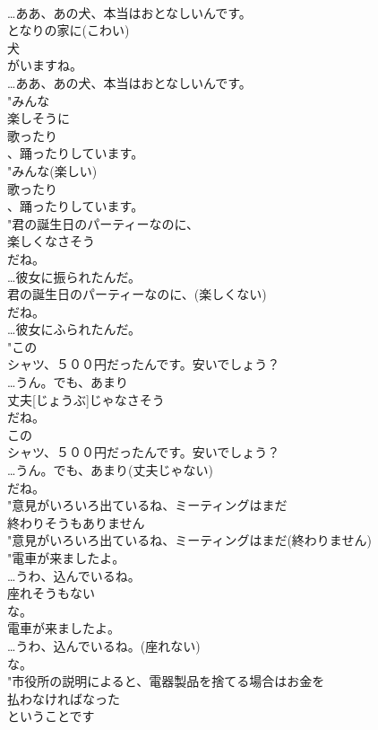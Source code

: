 \documentclass[8pt]{extreport}
\begin{document}
\begin{CJK}{UTF8}{min}
\\	…ああ、あの犬、本当はおとなしいんです。
\\	となりの家に(こわい)
\\	犬
\\	がいますね。
\\	…ああ、あの犬、本当はおとなしいんです。
\\	"みんな
\\	楽しそうに
\\	歌ったり
\\	、踊ったりしています。
\\	"みんな(楽しい)
\\	歌ったり
\\	、踊ったりしています。
\\	"君の誕生日のパーティーなのに、
\\	楽しくなさそう
\\	だね。
\\	…彼女に振られたんだ。
\\	君の誕生日のパーティーなのに、(楽しくない)
\\	だね。
\\	…彼女にふられたんだ。
\\	"この
\\	シャツ、５００円だったんです。安いでしょう？
\\	…うん。でも、あまり
\\	丈夫[じょうぶ]じゃなさそう
\\	だね。
\\	この
\\	シャツ、５００円だったんです。安いでしょう？
\\	…うん。でも、あまり(丈夫じゃない)
\\	だね。
\\	"意見がいろいろ出ているね、ミーティングはまだ
\\	終わりそうもありません
\\	"意見がいろいろ出ているね、ミーティングはまだ(終わりません)
\\	"電車が来ましたよ。
\\	…うわ、込んでいるね。
\\	座れそうもない
\\	な。
\\	電車が来ましたよ。
\\	…うわ、込んでいるね。(座れない)
\\	な。
\\	"市役所の説明によると、電器製品を捨てる場合はお金を
\\	払わなければなった
\\	ということです

\end{CJK}
\end{document}
